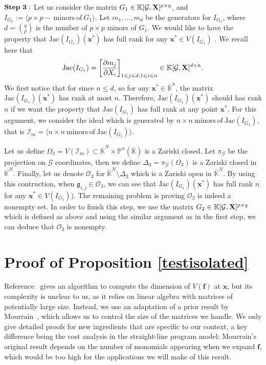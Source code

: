 \documentclass[11pt]{article}
\numberwithin{Property}{section}
\numberwithin{Theorem}{section}
\numberwithin{Proposition}{section}
\numberwithin{Lemma}{section}
\numberwithin{Corollary}{section}
\numberwithin{Definition}{section}
\numberwithin{Remark}{section}
\numberwithin{Conjecture}{section}
\numberwithin{Problem}{section}
\numberwithin{Claim}{section}
\theoremstyle{definition}
\numberwithin{Example}{section}
\renewcommand{\leq}{\leqslant}
\def\bar{\overline}
\newcommand{\field}{\mathbb{K}} %
\newcommand{\mat}[1]{\mathbf{\MakeUppercase{#1}}} %
\begin{document}
$\bf{Step \ 3:}$
Let us consider the matrix $G_1 \in \field[\mathcal{G}, \mat{X}]^{p \times q}$, and $I_{G_1} := \langle p \times p - \ \mathrm{minors \ of } \ G_1 \rangle$. Let $m_1, \ldots, m_d$ be the generators for $I_{G_1}$, where $d = {{q}\choose{p}}$ is the number of $p \times p$ minors of $G_1$. We would like to have the property that $\mathrm{Jac}(I_{G_1})(\mathbf{x}^*)$ has full rank for any $\mathbf{x}^* \in V(I_{G_1})$ . We recall here that $$\mathrm{Jac}(I_{G_1}) = \left[\frac{\partial m_j}{\partial X_i}\right]_{1 \leq j \leq d, 1 \leq i \leq n} \in \field[\mathcal{G}, \mat{X}]^{d \times n}. $$
We first notice that for since $n \leq d$, so for any $\mathbf{x}^* \in \bar{\field}^n$, the matrix $\mathrm{Jac}(I_{G_1})(\mathbf{x}^*)$ has rank at most $n$. Therefore, $\mathrm{Jac}(I_{G_1})(\mathbf{x}^*)$ should has rank $n$ if we want the property that $\mathrm{Jac}(I_{G_1})$ has full rank at any point $\mathbf{x}^*$. For this argument, we consider the ideal which is generated by $n \times n \ \mathrm{minors \ of} \ \mathrm{Jac}(I_{G_1})$, that is $\mathcal{I}_{m} = \langle n \times n  \ \mathrm{minors \ of} \ \mathrm{Jac}(I_{G_1}) \rangle$.

Let us define $\Omega_3 = V(\mathcal{I}_m) \subset \bar{\field}^N \times \mathbb{P}^n(\bar{\field})$ is a Zariski closed. Let $\pi_{\mathcal{G}}$ be the projection on $\mathcal{G}$ coordinates, then we define $\Delta_3 = \pi_{\mathcal{G}}(\Omega_3)$ is a Zariski closed in $\bar{\field}^N $. Finally, let us denote  $\mathcal{O}_3$ for $\bar{\field}^N \setminus \Delta_3$ which is a Zariski open in $\bar{\field}^N $. By using this contruction, when $\mathfrak{g}_{i,j} \in \mathcal{O}_3$, we can see that  $\mathrm{Jac}(I_{G_1})(\mathbf{x}^*)$ has full rank $n$ for any $\mathbf{x}^* \in V(I_{G_1})$). The remaining problem is proving $\mathcal{O}_3$ is indeed a nonempty set. In order to finish this step, we use the matrix $G_2 \in \field[\mathcal{G}, \mat{X}]^{p \times q}$ which is defined as above and using the similar argument as in the first step, we can deduce that $\mathcal{O}_3$ is nonempty.

\section{Proof of Proposition \ref{testisolated}}
\label{sec:prooftestisolated}
Reference~\cite{BaHaPeSo09} gives an algorithm to compute the dimension of $V(\mathbf{f})$ at $\mathbf{x}$, but its complexity is unclear to us, as it relies on linear algebra with matrices of potentially large size.
Instead, we use an adaptation of a prior result by Mourrain~\cite{Mourrain97}, which allows us to control the size of the matrices we handle. We only give detailed proofs for new ingredients that are specific to our context, a key difference being the cost analysis in the straight-line program model: Mourrain's original result depends on the number of monomials appearing when we expand $\mathbf{f}$, which would be too high for the applications we will make of this result.
\end{document}
